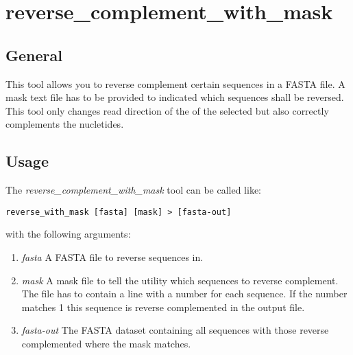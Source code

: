 \section{reverse\_complement\_with\_mask} \label{sec-revcomp}

\subsection{General}

This tool allows you to reverse complement certain sequences in a FASTA file. A
mask text file has to be provided to indicated which sequences shall
be reversed. This tool only changes read direction of the of the
selected but also correctly complements the nucletides.

\subsection{Usage}

The \emph{reverse\_complement\_with\_mask} tool can be called like:
\begin{lstlisting}
reverse_with_mask [fasta] [mask] > [fasta-out]
\end{lstlisting}
with the following arguments:
\begin{enumerate}
  \item \emph{fasta} A FASTA file to reverse sequences in.
  \item \emph{mask} A mask file to tell the utility which sequences to
    reverse complement. The file has to contain a line with a number for each
    sequence. If the number matches 1 this sequence is reverse complemented
    in the output file.
  \item \emph{fasta-out} The FASTA dataset containing all sequences
    with those reverse complemented where the mask matches.
\end{enumerate}

